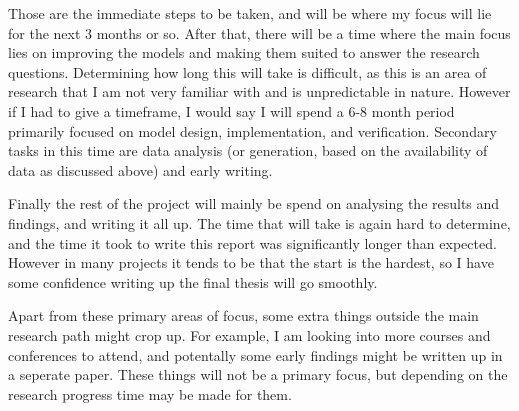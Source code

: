 \documentclass[a4paper,12pt]{article}
\begin{document}
\bigskip

Those are the immediate steps to be taken, and will be where my focus will lie for the next 3 months or so. After that, there will be a time where the main focus lies on improving the models and making them suited to answer the research questions. Determining how long this will take is difficult, as this is an area of research that I am not very familiar with and is unpredictable in nature. However if I had to give a timeframe, I would say I will spend a 6-8 month period primarily focused on model design, implementation, and verification. Secondary tasks in this time are data analysis (or generation, based on the availability of data as discussed above) and early writing. 

Finally the rest of the project will mainly be spend on analysing the results and findings, and writing it all up. The time that will take is again hard to determine, and the time it took to write this report was significantly longer than expected. However in many projects it tends to be that the start is the hardest, so I have some confidence writing up the final thesis will go smoothly. 

Apart from these primary areas of focus, some extra things outside the main research path might crop up. For example, I am looking into more courses and conferences to attend, and potentally some early findings might be written up in a seperate paper. These things will not be a primary focus, but depending on the research progress time may be made for them. 

\pagebreak



\end{document}
